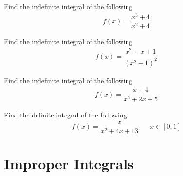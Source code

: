 \begin{exercise}
Find the indefinite integral of the following
\begin{align*}
    f(x) = \dfrac{x^{3} + 4}{x^{2} + 4}
\end{align*}
\end{exercise}

\begin{exercise}
Find the indefinite integral of the following
\begin{align*}
    f(x) = \dfrac{x^{2} + x + 1}{(x^{2} + 1)^{2}}
\end{align*}
\end{exercise}

\begin{exercise}
Find the indefinite integral of the following
\begin{align*}
    f(x) = \dfrac{x + 4}{x^{2} + 2x + 5}
\end{align*}
\end{exercise}

\begin{exercise}
Find the definite integral of the following
\begin{align*}
    f(x) = \dfrac{x}{x^{2} + 4x + 13} \hspace{20pt} x \in [0, 1]
\end{align*}
\end{exercise}

\newpage
\section{Improper Integrals}